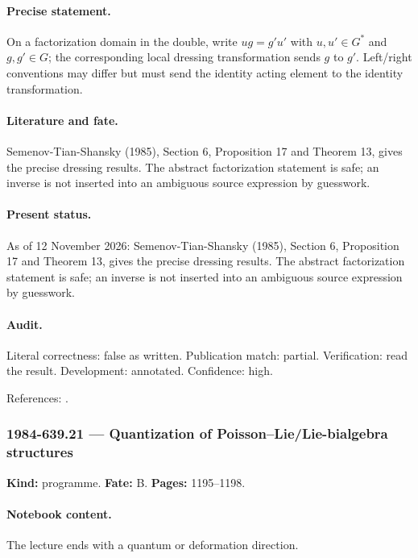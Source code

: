 \paragraph{Precise statement.} On a factorization domain in the double, write \(u g=g' u'\) with \(u,u'\in G^*\) and \(g,g'\in G\); the corresponding local dressing transformation sends \(g\) to \(g'\). Left/right conventions may differ but must send the identity acting element to the identity transformation.

\paragraph{Literature and fate.} Semenov-Tian-Shansky (1985), Section 6, Proposition 17 and Theorem 13, gives the precise dressing results. The abstract factorization statement is safe; an inverse is not inserted into an ambiguous source expression by guesswork.

\paragraph{Present status.} As of 12 November 2026: Semenov-Tian-Shansky (1985), Section 6, Proposition 17 and Theorem 13, gives the precise dressing results. The abstract factorization statement is safe; an inverse is not inserted into an ambiguous source expression by guesswork.

\paragraph{Audit.} Literal correctness: false as written. Publication match: partial. Verification: read the result. Development: annotated. Confidence: high.

\noindent References: \citep{semenov1985dressing}.\par

\subsubsection{1984-639.21 --- Quantization of Poisson--Lie/Lie-bialgebra structures}

\label{item:1984-639.21}

\noindent\textbf{Kind:} programme. \textbf{Fate:} B. \textbf{Pages:} 1195--1198.\par

\paragraph{Notebook content.} The lecture ends with a quantum or deformation direction.

